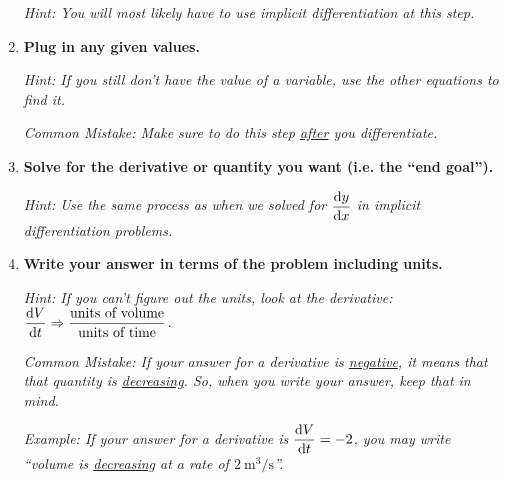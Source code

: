 \documentclass{siproblemset}
\begin{document}
\begin{enumerate}
        \textit{Hint: You will most likely have to use implicit differentiation at this step.}
        \item \textbf{Plug in any given values.}
        
        \textit{Hint: If you still don't have the value of a variable, use the other equations to find it.}
        
        \textit{Common Mistake: Make sure to do this step \underline{after} you differentiate.}
        \item \textbf{Solve for the derivative or quantity you want (i.e. the ``end goal'').}
        
        \textit{Hint: Use the same process as when we solved for $\dddx[y]$ in implicit differentiation problems.}
        \item \textbf{Write your answer in terms of the problem including units.}
        
        \textit{Hint: If you can't figure out the units, look at the derivative: $\dddf[V]{t}\Rightarrow\dfrac{\text{units of volume}}{\text{units of time}}$.}
        
        \textit{Common Mistake: If your answer for a derivative is \underline{negative}, it means that that quantity is \underline{decreasing}. So, when you write your answer, keep that in mind.}
        
        \textit{Example: If your answer for a derivative is $\dddf[V]{t}=-2$, you may write ``volume is \underline{decreasing} at a rate of $\SI{2}{\meter^3/\second}$''.}
    \end{enumerate}
    
\end{document}
